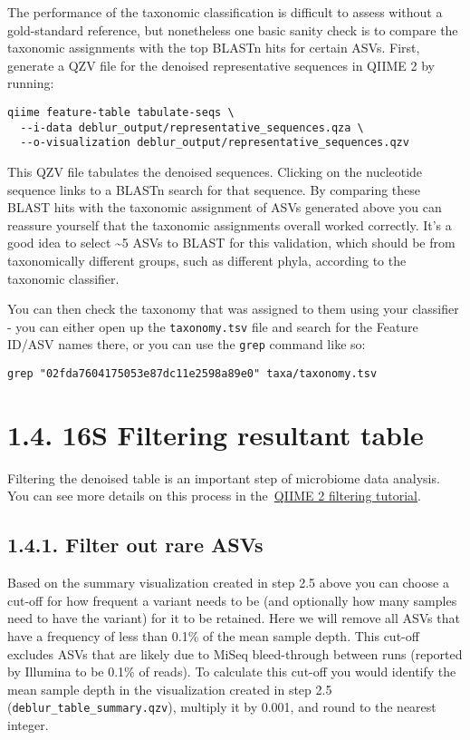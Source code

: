 \documentclass[
]{book}
\begin{document}
The performance of the taxonomic classification is difficult to assess without a gold-standard reference, but nonetheless one basic sanity check is to compare the taxonomic assignments with the top BLASTn hits for certain ASVs. First, generate a QZV file for the denoised representative sequences in QIIME 2 by running:

\begin{verbatim}
qiime feature-table tabulate-seqs \
  --i-data deblur_output/representative_sequences.qza \
  --o-visualization deblur_output/representative_sequences.qzv
\end{verbatim}

This QZV file tabulates the denoised sequences. Clicking on the nucleotide sequence links to a BLASTn search for that sequence. By comparing these BLAST hits with the taxonomic assignment of ASVs generated above you can reassure yourself that the taxonomic assignments overall worked correctly. It's a good idea to select \textasciitilde5 ASVs to BLAST for this validation, which should be from taxonomically different groups, such as different phyla, according to the taxonomic classifier.

You can then check the taxonomy that was assigned to them using your classifier - you can either open up the \texttt{taxonomy.tsv} file and search for the Feature ID/ASV names there, or you can use the \texttt{grep} command like so:

\begin{verbatim}
grep "02fda7604175053e87dc11e2598a89e0" taxa/taxonomy.tsv
\end{verbatim}

\section{1.4. 16S Filtering resultant table}\label{s-filtering-resultant-table}

Filtering the denoised table is an important step of microbiome data analysis. You can see more details on this process in the~\href{https://docs.qiime2.org/2022.11/tutorials/filtering/}{QIIME 2 filtering tutorial}.

\subsection{1.4.1. Filter out rare ASVs}\label{filter-out-rare-asvs}

Based on the summary visualization created in step 2.5 above you can choose a cut-off for how frequent a variant needs to be (and optionally how many samples need to have the variant) for it to be retained. Here we will remove all ASVs that have a frequency of less than 0.1\% of the mean sample depth. This cut-off excludes ASVs that are likely due to MiSeq bleed-through between runs (reported by Illumina to be 0.1\% of reads). To calculate this cut-off you would identify the mean sample depth in the visualization created in step 2.5 (\texttt{deblur\_table\_summary.qzv}), multiply it by 0.001, and round to the nearest integer.
\end{document}
